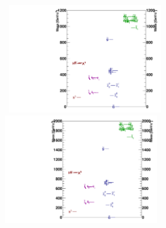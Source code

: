 \vspace{5mm}
\begin{minipage}{0.90\linewidth}
\begin{center}
\centering
\mbox{
\includegraphics[height= 0.6\textwidth, width=0.5\textwidth]{THESISPLOTS/GMSB-Lambda100TeV-Spectrum.pdf} \quad
\includegraphics[height= 0.6\textwidth, width=0.5\textwidth]{THESISPLOTS/GMSB-Lambda180TeV-Spectrum.pdf}  
}
\label{fig:spectra}
\end{center}
\end{minipage}


